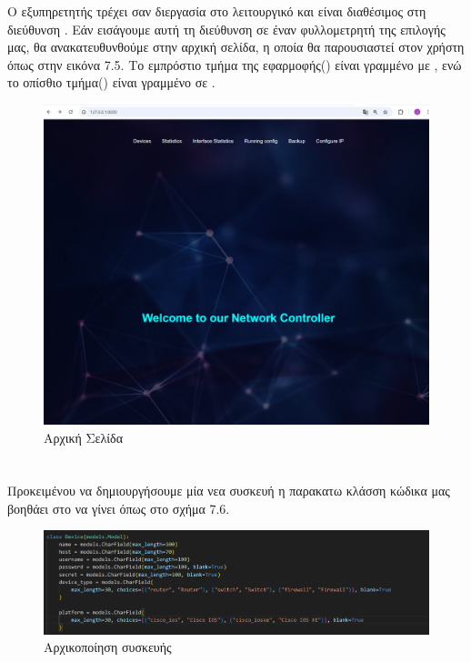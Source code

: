 \FloatBarrier



Ο εξυπηρετητής τρέχει σαν διεργασία στο λειτουργικό
και είναι διαθέσιμος στη διεύθυνση . Εάν εισάγουμε αυτή τη διεύθυνση σε έναν 
φυλλομετρητή της επιλογής μας, θα ανακατευθυνθούμε 
στην αρχική σελίδα, η οποία θα παρουσιαστεί στον 
χρήστη όπως στην εικόνα 7.5. Το εμπρόστιο τμήμα της εφαρμοφής() 
είναι γραμμένο με , ενώ το οπίσθιο τμήμα() 
είναι γραμμένο σε .

\FloatBarrier
\begin{figure}[h]
	\centering
	\includegraphics[width=1.2\textwidth]{graphics/home_page.png}
	\caption{ Αρχική Σελίδα}
\end{figure}

\FloatBarrier %

\section{}

Προκειμένου να δημιουργήσουμε μία νεα συσκευή η παρακατω κλάσση
κώδικα μας βοηθάει στο να γίνει όπως στο σχήμα 7.6.

\FloatBarrier
\begin{figure}[htb]
	\centering
	\includegraphics[width=1.2\textwidth]{graphics/class_device.png}
	\caption{Αρχικοποίηση συσκευής}
\end{figure}

